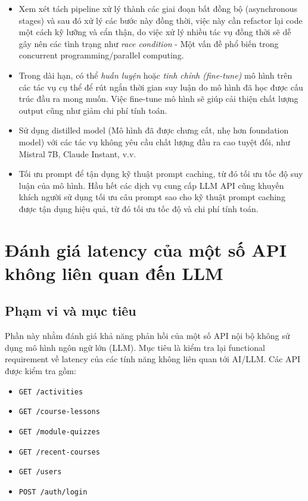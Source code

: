 \begin{itemize}
    \item Xem xét tách pipeline xử lý thành các giai đoạn bất đồng bộ (asynchronous stages) và sau đó xử lý các bước này đồng thời, việc này cần refactor lại code một cách kỹ lưỡng và cẩn thận, do việc xử lý nhiều tác vụ đồng thời sẽ dễ gây nên các tình trạng như \emph{race condition} - Một vấn đề phổ biến trong concurrent programming/parallel computing.

    \item Trong dài hạn, có thể \emph{huấn luyện} hoặc \emph{tinh chỉnh (fine-tune)} mô hình trên các tác vụ cụ thể để rút ngắn thời gian suy luận do mô hình đã học được cấu trúc đầu ra mong muốn. Việc fine-tune mô hình sẽ giúp cải thiện chất lượng output cũng như giảm chi phí tính toán.

    \item Sử dụng distilled model (Mô hình đã được chưng cất, nhẹ hơn foundation model) với các tác vụ không yêu cầu chất lượng đầu ra cao tuyệt đối, như Mistral 7B, Claude Instant, v.v.

    \item Tối ưu prompt để tận dụng kỹ thuật prompt caching, từ đó tối ưu tốc độ suy luận của mô hình. Hầu hết các dịch vụ cung cấp LLM API cũng khuyến khích người sử dụng tối ưu câu prompt sao cho kỹ thuật prompt caching được tận dụng hiệu quả, từ đó tối ưu tốc độ và chi phí tính toán\cite{openaiPromptCaching}.
\end{itemize}

\section{Đánh giá latency của một số API không liên quan đến LLM}

\subsection{Phạm vi và mục tiêu}

Phần này nhằm đánh giá khả năng phản hồi của một số API nội bộ không sử dụng mô hình ngôn ngữ lớn (LLM). Mục tiêu là kiểm tra lại functional requirement về latency của các tính năng không liên quan tới AI/LLM. Các API được kiểm tra gồm:
\begin{itemize}
    \item \texttt{GET /activities}
    \item \texttt{GET /course-lessons}
    \item \texttt{GET /module-quizzes}
    \item \texttt{GET /recent-courses}
    \item \texttt{GET /users}
    \item \texttt{POST /auth/login}
\end{itemize}

